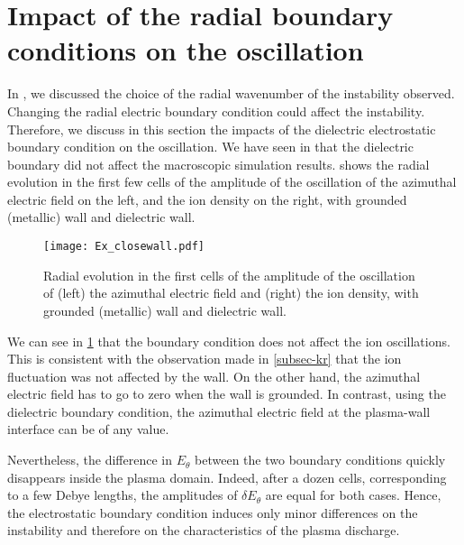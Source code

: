 
\section{Impact of the radial boundary conditions on the oscillation}
  \label{subsec-BC}

  In , we discussed the choice of the radial wavenumber of the instability observed.
  Changing the radial electric boundary condition could affect the instability.
  Therefore, we discuss in this section  the impacts of the dielectric electrostatic boundary condition on the oscillation.
  We have seen in  that the dielectric boundary did not affect the macroscopic simulation results.
   shows the radial evolution in the first few cells of the amplitude of the oscillation of the azimuthal electric field on the left, and the ion density on the right, with grounded (metallic) wall and dielectric wall.
  
  \begin{figure}[!hbt]
    \centering
    \texttt{[image: Ex\_closewall.pdf]}
    \caption{Radial evolution in the first cells of the amplitude of the oscillation of (left) the azimuthal electric field and (right) the ion density, with grounded (metallic) wall and dielectric wall.}
    \label{fig-closswallosci}
  \end{figure}
  
  We can see in \cref{fig-closswallosci} that the boundary condition does not affect the ion oscillations.
  This is consistent with the observation made in \cref{subsec-kr} that the ion fluctuation was not affected by the wall.
  On the other hand, the azimuthal electric field has to go to zero when the wall is grounded.
  In contrast, using the dielectric boundary condition, the azimuthal electric field at the plasma-wall interface can be of any value.
  
  Nevertheless, the difference in $E_{\theta}$ between the two boundary conditions quickly disappears inside the plasma domain.
  Indeed, after a dozen cells, corresponding to a few Debye lengths, the amplitudes of $\delta E_{\theta}$ are equal for both cases.
  Hence, the electrostatic boundary condition induces only minor differences on the instability and therefore on the characteristics of  the plasma discharge.
  
  